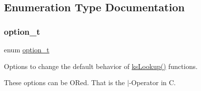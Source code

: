 \subsection{Enumeration Type Documentation}
\mbox{\label{group__keyset_ga98a3d6a4016c9dad9cbd1a99a9c2a45a}} 
\subsubsection{\texorpdfstring{option\+\_\+t}{option\_t}}
{\footnotesize\ttfamily enum \hyperlink{group__keyset_ga98a3d6a4016c9dad9cbd1a99a9c2a45a}{option\+\_\+t}}



Options to change the default behavior of \hyperlink{group__keyset_gaa34fc43a081e6b01e4120daa6c112004}{ks\+Lookup()} functions. 

These options can be O\+Red. That is the $\vert$-\/\+Operator in C.

